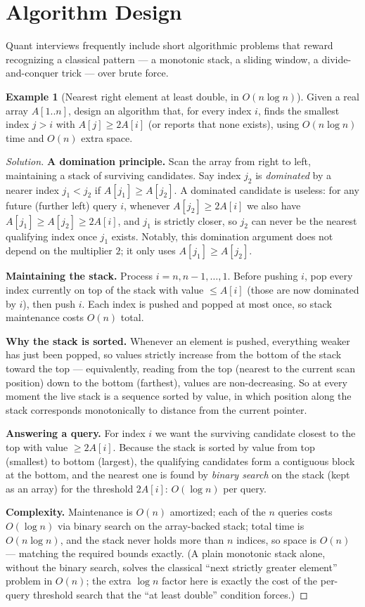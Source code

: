 \documentclass[11pt]{article}
\theoremstyle{definition}
\newtheorem{example}{Example}[section]
\begin{document}
\section{Algorithm Design}
Quant interviews frequently include short algorithmic problems that reward recognizing a classical pattern — a monotonic stack, a sliding window, a divide-and-conquer trick — over brute force.

\begin{example}[Nearest right element at least double, in $O(n\log n)$]
Given a real array $A[1..n]$, design an algorithm that, for every index $i$, finds the smallest index $j>i$ with $A[j]\ge 2A[i]$ (or reports that none exists), using $O(n\log n)$ time and $O(n)$ extra space.
\end{example}

\begin{proof}[Solution]
\textbf{A domination principle.} Scan the array from right to left, maintaining a stack of surviving candidates. Say index $j_2$ is \emph{dominated} by a nearer index $j_1<j_2$ if $A[j_1]\ge A[j_2]$. A dominated candidate is useless: for any future (further left) query $i$, whenever $A[j_2]\ge 2A[i]$ we also have $A[j_1]\ge A[j_2]\ge2A[i]$, and $j_1$ is strictly closer, so $j_2$ can never be the nearest qualifying index once $j_1$ exists. Notably, this domination argument does not depend on the multiplier $2$; it only uses $A[j_1]\ge A[j_2]$.

\textbf{Maintaining the stack.} Process $i=n,n-1,\dots,1$. Before pushing $i$, pop every index currently on top of the stack with value $\le A[i]$ (those are now dominated by $i$), then push $i$. Each index is pushed and popped at most once, so stack maintenance costs $O(n)$ total.

\textbf{Why the stack is sorted.} Whenever an element is pushed, everything weaker has just been popped, so values strictly increase from the bottom of the stack toward the top — equivalently, reading from the top (nearest to the current scan position) down to the bottom (farthest), values are non-decreasing. So at every moment the live stack is a sequence sorted by value, in which position along the stack corresponds monotonically to distance from the current pointer.

\textbf{Answering a query.} For index $i$ we want the surviving candidate closest to the top with value $\ge2A[i]$. Because the stack is sorted by value from top (smallest) to bottom (largest), the qualifying candidates form a contiguous block at the bottom, and the nearest one is found by \emph{binary search} on the stack (kept as an array) for the threshold $2A[i]$: $O(\log n)$ per query.

\textbf{Complexity.} Maintenance is $O(n)$ amortized; each of the $n$ queries costs $O(\log n)$ via binary search on the array-backed stack; total time is $O(n\log n)$, and the stack never holds more than $n$ indices, so space is $O(n)$ — matching the required bounds exactly. (A plain monotonic stack alone, without the binary search, solves the classical ``next strictly greater element'' problem in $O(n)$; the extra $\log n$ factor here is exactly the cost of the per-query threshold search that the ``at least double'' condition forces.)
\end{proof}
\end{document}
